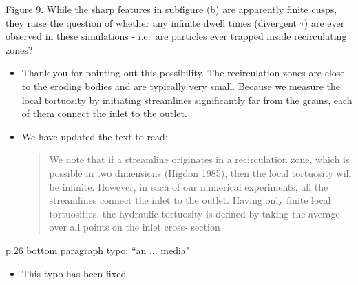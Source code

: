 \documentclass[11pt]{article}
\newcommand{\comment}[1]{{\color{blue} #1}}
\begin{document}
\noindent
\comment{Figure 9.  While the sharp features in subfigure (b) are
apparently finite cusps, they raise the question of whether any infinite
dwell times (divergent $\tau$) are ever observed in these simulations -
i.e.~are particles ever trapped inside recirculating zones?}
\begin{itemize}
  \item Thank you for pointing out this possibility. The
    recirculation zones are close to the eroding bodies and are
    typically very small. Because we measure the local tortuosity by
    initiating streamlines significantly far from the grains, each of
    them connect the inlet to the outlet.

  \item We have updated the text to read:
    \begin{quotation}
      \noindent
      We note that if a streamline originates in a recirculation zone,
      which is possible in two dimensions (Higdon 1985), then the local
      tortuosity will be infinite. However, in each of our numerical
      experiments, all the streamlines connect the inlet to the outlet.
      Having only finite local tortuosities, the hydraulic tortuosity is
      defined by taking the average over all points on the inlet cross-
      section
    \end{quotation}
\end{itemize}

\noindent
\comment{p.26 bottom paragraph typo: ``an ... media"}
\begin{itemize}
  \item This typo has been fixed
\end{itemize}
\end{document}

